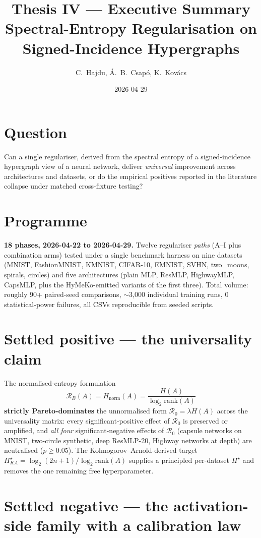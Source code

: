 \documentclass[11pt,a4paper]{article}
\title{Thesis IV --- Executive Summary\\
       \large Spectral-Entropy Regularisation on Signed-Incidence Hypergraphs}
\author{C.~Hajdu, \'A.~B.~Csap\'o, K.~Kov\'acs}
\date{2026-04-29}
\begin{document}
\maketitle

\section*{Question}

Can a single regulariser, derived from the spectral entropy of a
signed-incidence hypergraph view of a neural network, deliver
\emph{universal} improvement across architectures and datasets, or do
the empirical positives reported in the literature collapse under
matched cross-fixture testing?

\section*{Programme}

\textbf{18 phases, 2026-04-22 to 2026-04-29.} Twelve regulariser
\emph{paths} (A--I plus combination arms) tested under a single
benchmark harness on nine datasets (MNIST, FashionMNIST, KMNIST,
CIFAR-10, EMNIST, SVHN, two\_moons, spirals, circles) and five
architectures (plain MLP, ResMLP, HighwayMLP, CapsMLP, plus the
HyMeKo-emitted variants of the first three). Total volume:
roughly 90+ paired-seed comparisons, $\sim$3{,}000 individual
training runs, 0 statistical-power failures, all CSVs reproducible
from seeded scripts.

\section*{Settled positive --- the universality claim}

The normalised-entropy formulation
\[
\mathcal{R}_B(A) = H_{\text{norm}}(A) = \frac{H(A)}{\log_2 \mathrm{rank}(A)}
\]
\textbf{strictly Pareto-dominates} the unnormalised form
$\mathcal{R}_0 = \lambda H(A)$ across the universality matrix:
every significant-positive effect of $\mathcal{R}_0$ is preserved or
amplified, and \emph{all four} significant-negative effects of
$\mathcal{R}_0$ (capsule networks on MNIST, two-circle synthetic, deep
ResMLP-20, Highway networks at depth) are neutralised
($p\!\geq\!0.05$). The Kolmogorov--Arnold-derived target
$H^\star_{KA}=\log_2(2n+1)/\log_2 \mathrm{rank}(A)$ supplies a
principled per-dataset $H^\star$ and removes the one remaining free
hyperparameter.

\section*{Settled negative --- the activation-side family with a calibration law}
\end{document}
